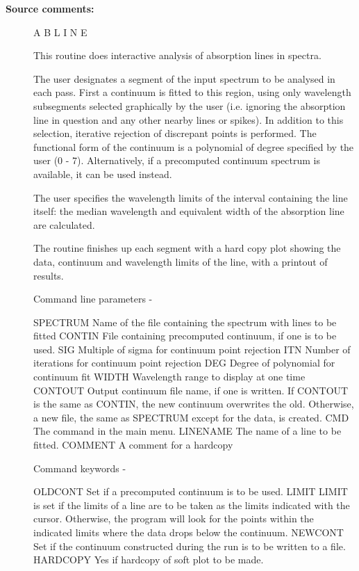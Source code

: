 \begin{description}
\item [{\bf Source comments:}]
 A B L I N E

 This routine does interactive analysis of absorption lines in spectra.

 The user designates a segment of the input spectrum to
 be analysed in each pass.  First a continuum is fitted to this
 region, using only wavelength subsegments selected graphically
 by the user (i.e. ignoring the absorption line in question and any
 other nearby lines or spikes).  In addition to this selection,
 iterative rejection of discrepant points is performed.  The functional
 form of the continuum is a polynomial of degree specified by the
 user (0 - 7).  Alternatively, if a precomputed continuum spectrum
 is available, it can be used instead.

 The user specifies the wavelength limits of the interval containing
 the line itself: the median wavelength and equivalent width of the
 absorption line are calculated.

 The routine finishes up each segment with a hard copy plot showing
 the data, continuum and wavelength limits of the line, with a
 printout of results.

 Command line parameters -

 SPECTRUM    Name of the file containing the spectrum with
             lines to be fitted
 CONTIN      File containing precomputed continuum, if one is
             to be used.
 SIG         Multiple of sigma for continuum point rejection
 ITN         Number of iterations for continuum point rejection
 DEG         Degree of polynomial for continuum fit
 WIDTH       Wavelength range to display at one time
 CONTOUT     Output continuum file name, if one is written.  If
             CONTOUT is the same as CONTIN, the new continuum
             overwrites the old.  Otherwise, a new file, the same
             as SPECTRUM except for the data, is created.
 CMD         The command in the main menu.
 LINENAME    The name of a line to be fitted.
 COMMENT     A comment for a hardcopy

 Command keywords -

 OLDCONT     Set if a precomputed continuum is to be used.
 LIMIT       LIMIT is set if the limits of a line are to be
             taken as the limits indicated with the cursor.
             Otherwise, the program will look for the points
             within the indicated limits where the data drops
             below the continuum.
 NEWCONT     Set if the continuum constructed during the run
             is to be written to a file.
 HARDCOPY    Yes if hardcopy of soft plot to be made.


\end{description}
